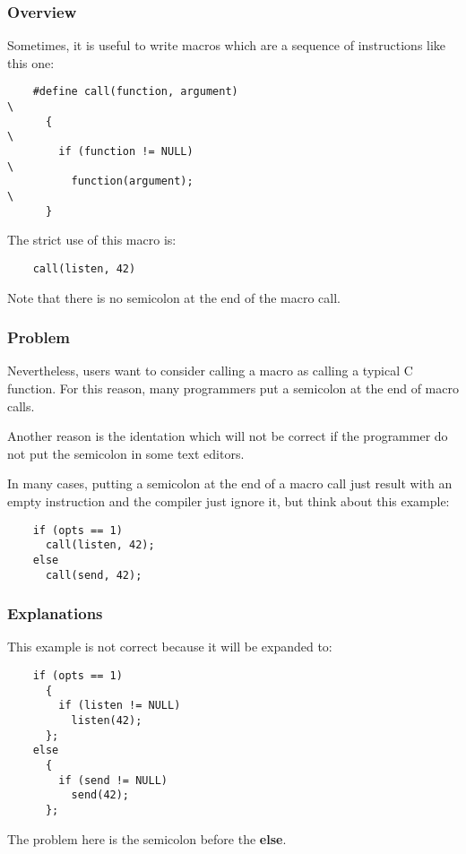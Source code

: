 \documentclass[8pt]{beamer}
\newcommand{\nl}[0]{\vspace{0.4cm}}
\begin{document}

\begin{frame}[containsverbatim]
  \frametitle{Overview}

  Sometimes, it is useful to write macros which are a sequence of
  instructions like this one:

  \begin{verbatim}
    #define call(function, argument)                                    \
      {                                                                 \
        if (function != NULL)                                           \
          function(argument);                                           \
      }
  \end{verbatim}

  The strict use of this macro is:

  \begin{verbatim}
    call(listen, 42)
  \end{verbatim}

  Note that there is no semicolon at the end of the macro call.
\end{frame}


\begin{frame}[containsverbatim]
  \frametitle{Problem}

  Nevertheless, users want to consider calling a macro as calling a
  typical C function. For this reason, many programmers put a semicolon
  at the end of macro calls.

  \nl

  Another reason is the identation which will not be correct if the
  programmer do not put the semicolon in some text editors.

  \nl

  In many cases, putting a semicolon at the end of a macro call
  just result with an empty instruction and the compiler just ignore it,
  but think about this example:

  \begin{verbatim}
    if (opts == 1)
      call(listen, 42);
    else
      call(send, 42);
  \end{verbatim}
\end{frame}


\begin{frame}[containsverbatim]
  \frametitle{Explanations}

  This example is \alert{not} correct because it will be expanded to:

  \begin{verbatim}
    if (opts == 1)
      {
        if (listen != NULL)
          listen(42);
      };
    else
      {
        if (send != NULL)
          send(42);
      };
  \end{verbatim}

  The problem here is the semicolon before the \textbf{else}.
\end{frame}
\end{document}
